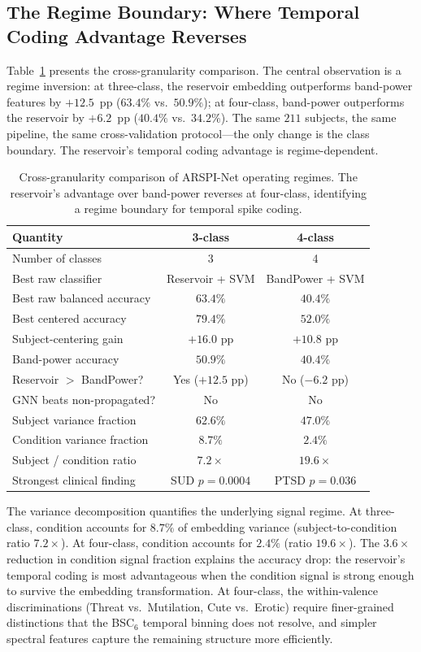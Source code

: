 \subsection{The Regime Boundary: Where Temporal Coding Advantage Reverses}

Table~\ref{tab:regime_comparison} presents the cross-granularity comparison. The central observation is a regime inversion: at three-class, the reservoir embedding outperforms band-power features by $+12.5$~pp ($63.4\%$ vs.\ $50.9\%$); at four-class, band-power outperforms the reservoir by $+6.2$~pp ($40.4\%$ vs.\ $34.2\%$). The same $211$ subjects, the same pipeline, the same cross-validation protocol---the only change is the class boundary. The reservoir's temporal coding advantage is regime-dependent.

\begin{table}[t]
\centering
\caption{Cross-granularity comparison of ARSPI-Net operating regimes. The reservoir's advantage over band-power reverses at four-class, identifying a regime boundary for temporal spike coding.}
\label{tab:regime_comparison}
\small
\renewcommand{\arraystretch}{1.15}
\begin{tabular}{lcc}
\hline
\textbf{Quantity} & \textbf{3-class} & \textbf{4-class} \\
\hline
Number of classes & 3 & 4 \\
Best raw classifier & Reservoir + SVM & BandPower + SVM \\
Best raw balanced accuracy & $63.4\%$ & $40.4\%$ \\
Best centered accuracy & $79.4\%$ & $52.0\%$ \\
Subject-centering gain & $+16.0$ pp & $+10.8$ pp \\
Band-power accuracy & $50.9\%$ & $40.4\%$ \\
Reservoir $>$ BandPower? & Yes ($+12.5$ pp) & No ($-6.2$ pp) \\
GNN beats non-propagated? & No & No \\
Subject variance fraction & $62.6\%$ & $47.0\%$ \\
Condition variance fraction & $8.7\%$ & $2.4\%$ \\
Subject / condition ratio & $7.2\times$ & $19.6\times$ \\
Strongest clinical finding & SUD $p = 0.0004$ & PTSD $p = 0.036$ \\
\hline
\end{tabular}
\end{table}

The variance decomposition quantifies the underlying signal regime. At three-class, condition accounts for $8.7\%$ of embedding variance (subject-to-condition ratio $7.2\times$). At four-class, condition accounts for $2.4\%$ (ratio $19.6\times$). The $3.6\times$ reduction in condition signal fraction explains the accuracy drop: the reservoir's temporal coding is most advantageous when the condition signal is strong enough to survive the embedding transformation. At four-class, the within-valence discriminations (Threat vs.\ Mutilation, Cute vs.\ Erotic) require finer-grained distinctions that the BSC$_6$ temporal binning does not resolve, and simpler spectral features capture the remaining structure more efficiently.

